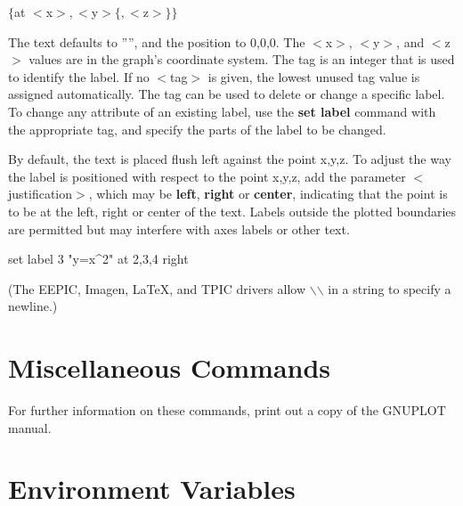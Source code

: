 {$\{$at $<$x$>,<$y$>\{,<$z$>\}\}$}

The text defaults to '''', and the position to 0,0,0.  The $<$x$>$, $<$y$>$, and
$<$z$>$ values are in the graph's coordinate system.  The tag is an
integer that is used to identify the label. If no $<$tag$>$ is given, the
lowest unused tag value is assigned automatically. The tag can be used
to delete or change a specific label. To change any attribute of an
existing label, use the {\bf set label} command with the appropriate tag,
and specify the parts of the label to be changed.

By default, the text is placed flush left against the point x,y,z.
To adjust the way the label is positioned with respect to the point
x,y,z, add the parameter $<$justification$>$, which may be {\bf left}, {\bf right}
or {\bf center}, indicating that the point is to be at the left, right or
center of the text. Labels outside the plotted boundaries are
permitted but may interfere with axes labels or other text.

{set label 3 "y=x^2" at 2,3,4 right}

(The EEPIC, Imagen, LaTeX, and TPIC drivers allow $\backslash$$\backslash$
in a string to specify a newline.)

\section{Miscellaneous Commands}

For further information on these commands, print out a copy
of the GNUPLOT manual.


\section{Environment Variables}

